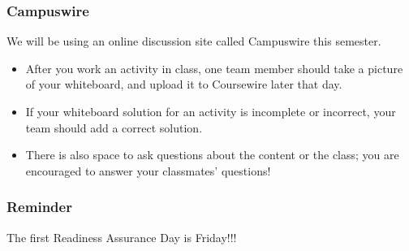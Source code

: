 \documentclass[aspectration=1610]{beamer}
\begin{document}
\begin{frame}\frametitle{Campuswire}
We will be using an online discussion site called Campuswire this semester.
\begin{itemize}
\item After you work an activity in class, one team member should take a picture of your whiteboard, and upload it to Coursewire later that day.
\item If your whiteboard solution for an activity is incomplete or incorrect, your team should add a correct solution.
\item There is also space to ask questions about the content or the class; you are encouraged to answer your classmates' questions!
\end{itemize}

\end{frame}


\begin{frame}\frametitle{Reminder}
The first Readiness Assurance Day is Friday!!!
\end{frame}
\end{document}
